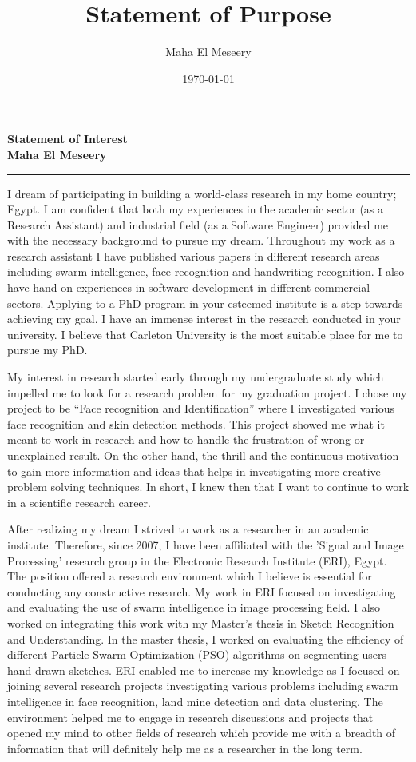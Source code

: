 \documentclass[10pt]{article}%
\title{Statement of Purpose}
\author{Maha El Meseery }
\date{\today}
\begin{document}
\large
 \begin{center}
\textbf{ Statement of  Interest \\ Maha El Meseery } \hrule
\end{center}
\normalsize

I dream of participating in building a world-class research in my home country; Egypt. I am confident that both my experiences in the academic sector (as a Research Assistant) and industrial field (as a Software Engineer) provided me with the necessary background to pursue my dream. Throughout my work as a research assistant I have published various papers in different research areas including swarm intelligence, face recognition and handwriting recognition. I also have hand-on experiences in software development in different commercial sectors. Applying to a PhD program in your esteemed institute is a step towards achieving my goal. I have an immense interest in the research conducted in your university. I believe that Carleton University is the most suitable place for me to pursue my PhD.

 My interest in research started early through my undergraduate study which impelled me to look for a research problem for my graduation project. I chose my project to be ``Face recognition and Identification'' where I investigated various face recognition and skin detection methods. This project showed me what it meant to work in research and how to handle the frustration of wrong or unexplained result. On the other hand, the thrill and the continuous motivation to gain more information and ideas that helps in investigating more creative problem solving techniques. In short, I knew then that I want to continue to work in a scientific research career.


 After realizing my dream I strived to work as a researcher in an academic institute. Therefore, since 2007, I have been affiliated with the 'Signal and Image Processing' research group in the Electronic Research Institute (ERI), Egypt. The position offered a research environment which I believe is essential for conducting any constructive research. My work in ERI focused on investigating and evaluating the use of swarm intelligence in image processing field. I also worked on integrating this work with my Master's thesis in Sketch Recognition and Understanding. In the master thesis, I worked on evaluating the efficiency of different Particle Swarm Optimization (PSO) algorithms on segmenting users hand-drawn sketches. ERI enabled me to increase my knowledge as I focused on joining several research projects investigating various problems including swarm intelligence in face recognition, land mine detection and data clustering. The environment helped me to engage in research discussions and projects that opened my mind to other fields of research which provide me with a breadth of information that will definitely help me as a researcher in the long term.
\end{document}
